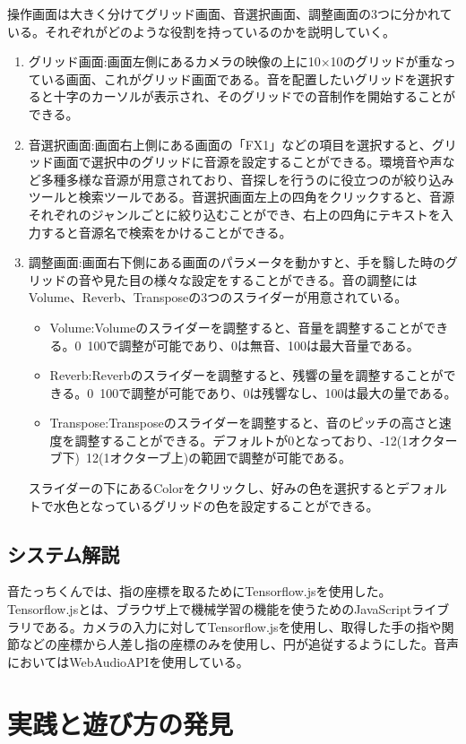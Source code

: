 \documentclass[platex,dvipdfmx]{jlreq}			%
\begin{document}
操作画面は大きく分けてグリッド画面、音選択画面、調整画面の3つに分かれている。それぞれがどのような役割を持っているのかを説明していく。
\begin{enumerate}
  \item グリッド画面:画面左側にあるカメラの映像の上に10×10のグリッドが重なっている画面、これがグリッド画面である。音を配置したいグリッドを選択すると十字のカーソルが表示され、そのグリッドでの音制作を開始することができる。
  \item 音選択画面:画面右上側にある画面の「FX1」などの項目を選択すると、グリッド画面で選択中のグリッドに音源を設定することができる。環境音や声など多種多様な音源が用意されており、音探しを行うのに役立つのが絞り込みツールと検索ツールである。音選択画面左上の四角をクリックすると、音源それぞれのジャンルごとに絞り込むことができ、右上の四角にテキストを入力すると音源名で検索をかけることができる。
  \item 調整画面:画面右下側にある画面のパラメータを動かすと、手を翳した時のグリッドの音や見た目の様々な設定をすることができる。音の調整にはVolume、Reverb、Transposeの3つのスライダーが用意されている。
  \begin{itemize}
    \item Volume:Volumeのスライダーを調整すると、音量を調整することができる。0~100で調整が可能であり、0は無音、100は最大音量である。
    \item Reverb:Reverbのスライダーを調整すると、残響の量を調整することができる。0~100で調整が可能であり、0は残響なし、100は最大の量である。
    \item Transpose:Transposeのスライダーを調整すると、音のピッチの高さと速度を調整することができる。デフォルトが0となっており、-12(1オクターブ下)~12(1オクターブ上)の範囲で調整が可能である。
  \end{itemize}
  スライダーの下にあるColorをクリックし、好みの色を選択するとデフォルトで水色となっているグリッドの色を設定することができる。
\end{enumerate}

\subsection{システム解説}
音たっちくんでは、指の座標を取るためにTensorflow.jsを使用した。Tensorflow.jsとは、ブラウザ上で機械学習の機能を使うためのJavaScriptライブラリである。カメラの入力に対してTensorflow.jsを使用し、取得した手の指や関節などの座標から人差し指の座標のみを使用し、円が追従するようにした。音声においてはWebAudioAPIを使用している。

\section{実践と遊び方の発見}
\end{document}

